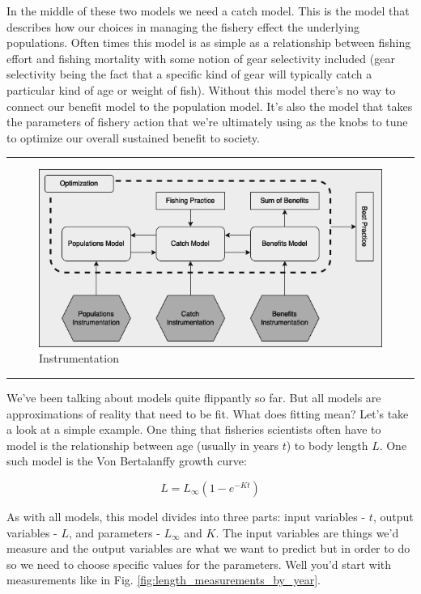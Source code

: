\documentclass[11pt,a5paper]{book}
\begin{document}
In the middle of these two models we need a catch model. This is the model that describes how our choices in managing the fishery effect the underlying populations. Often times this model is as simple as a relationship between fishing effort and fishing mortality with some notion of gear selectivity included (gear selectivity being the fact that a specific kind of gear will typically catch a particular kind of age or weight of fish). Without this model there's no way to connect our benefit model to the population model. It's also the model that takes the parameters of fishery action that we're ultimately using as the knobs to tune to optimize our overall sustained benefit to society. 
\newpage

\noindent \rule{\textwidth}{0.5pt} 
\begin{figure}[h!] 
  \includegraphics[width=\linewidth]{drawings/high_level_instrumentation.png}
  \caption{Instrumentation}
  \label{fig:high_level_instrumentation}
\end{figure}
\newline
\rule{\textwidth}{0.5pt} 
\vspace{5pt}

We've been talking about models quite flippantly so far. But all models are approximations of reality that need to be fit. What does fitting mean? Let's take a look at a simple example. One thing that fisheries scientists often have to model is the relationship between age (usually in years $t$) to body length $L$. One such model is the Von Bertalanffy growth curve:

$$L = L_{\infty}(1-e^{-Kt})$$


As with all models, this model divides into three parts: input variables - $t$, output variables - $L$, and parameters - $L_{\infty}$ and $K$. The input variables are things we'd measure and the output variables are what we want to predict but in order to do so we need to choose specific values for the parameters. Well you'd start with measurements like in Fig. \ref{fig:length_measurements_by_year}.
\end{document}
